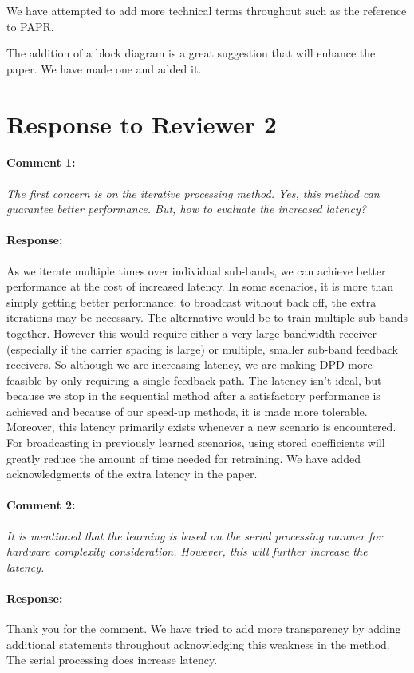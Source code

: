 \documentclass[]{article}
\begin{document}
We have attempted to add more technical terms throughout such as the reference to PAPR. 

The addition of a block diagram is a great suggestion that will enhance the paper. We have made one and added it.


\section{Response to Reviewer 2}
\paragraph{Comment 1:}\textit{The first concern is on the iterative processing method. Yes, this method can guarantee better performance. But, how to evaluate the increased latency?}
\paragraph{Response:}
As we iterate multiple times over individual sub-bands, we can achieve better performance at the cost of increased latency. 
In some scenarios, it is more than simply getting better performance; to broadcast without back off, the extra iterations may be necessary. 
The alternative would be to train multiple sub-bands together. However this would require either a very large bandwidth receiver (especially if the carrier spacing is large) or multiple, smaller sub-band feedback receivers. So although we are increasing latency, we are making DPD more feasible by only requiring a single feedback path. 
The latency isn't ideal, but because we stop in the sequential method after a satisfactory performance is achieved and because of our speed-up methods, it is made more tolerable. Moreover, this latency primarily exists whenever a new scenario is encountered. For broadcasting in previously learned scenarios, using stored coefficients will greatly reduce the amount of time needed for retraining. 
We have added acknowledgments of the extra latency in the paper.

\paragraph{Comment 2:}\textit{It is mentioned that the learning is based on the serial processing manner for hardware complexity consideration. However, this will further increase the latency.}
\paragraph{Response:}
Thank you for the comment. We have tried to add more transparency by adding additional statements throughout acknowledging this weakness in the method. The serial processing does increase latency.
	
\end{document}
